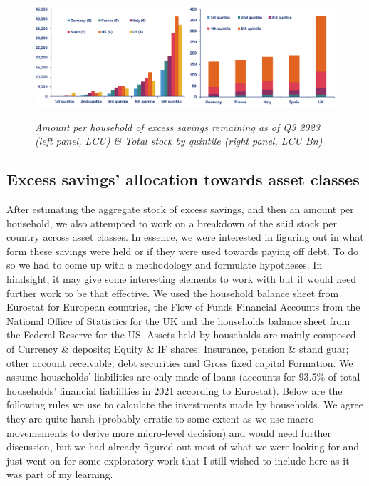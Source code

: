 \begin{figure}[H]
    \centering
    \caption{\textit{Amount per household of excess savings remaining as of Q3 2023 (left panel, LCU) \& Total stock by quintile (right panel, LCU Bn)}}
    \includegraphics[width=1\textwidth]{Core/1.Savings/img/xSavings.png}
    \label{figure:Savings}
\end{figure}

\subsection{Excess savings' allocation towards asset classes}

\quad After estimating the aggregate stock of excess savings, and then an amount per household, we also attempted to work on a breakdown of the said stock per country across asset classes. 
In essence, we were interested in figuring out in what form these savings were held or if they were used towards paying off debt. To do so we had to come up with a methodology and formulate hypotheses. 
In hindsight, it may give some interesting elements to work with but it would need further work to be that effective. 
We used the household balance sheet from Eurostat for European countries, the Flow of Funds Financial Accounts from the National Office of Statistics for the UK and the households balance sheet from the Federal Reserve for the US. 
Assets held by households are mainly composed of Currency \& deposits; Equity \& IF shares; Insurance, pension \& stand guar; other account receivable;	debt securities and Gross fixed capital Formation. We assume households’ liabilities are only made of loans (accounts for 93.5\% of total households' financial liabilities in 2021 according to Eurostat). 
Below are the following rules we use to calculate the investments made by households. We agree they are quite harsh (probably erratic to some extent as we use macro movemements to derive more micro-level decision) and would need further discussion, but we had already figured out most of what we were looking for and just went on for some exploratory work that I still wished to include here as it was part of my learning.

